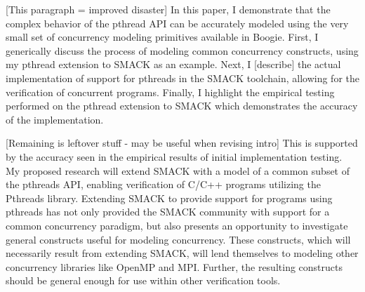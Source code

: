 [This paragraph = improved disaster]
In this paper, I demonstrate that the complex behavior of the pthread API can be accurately modeled using the very small set of concurrency modeling primitives available in Boogie.  First, I generically discuss the process of modeling common concurrency constructs, using my pthread extension to SMACK as an example. Next, I [describe] the actual implementation of support for pthreads in the SMACK toolchain, allowing for the verification of concurrent programs.  Finally, I highlight the empirical testing performed on the pthread extension to SMACK which demonstrates the accuracy of the implementation.  


[Remaining is leftover stuff - may be useful when revising intro]
This is supported by the accuracy seen in the empirical results of initial implementation testing.  My proposed research will extend SMACK with a model of a common subset of the pthreads API, enabling verification of C/C++ programs utilizing the Pthreads library.  Extending SMACK to provide support for programs using pthreads has not only provided the SMACK community with support for a common concurrency paradigm, but also presents an opportunity to investigate general constructs useful for modeling concurrency.  These constructs, which will necessarily result from extending SMACK, will lend themselves to modeling other concurrency libraries like OpenMP and MPI.  Further, the resulting constructs should be general enough for use within other verification tools.
